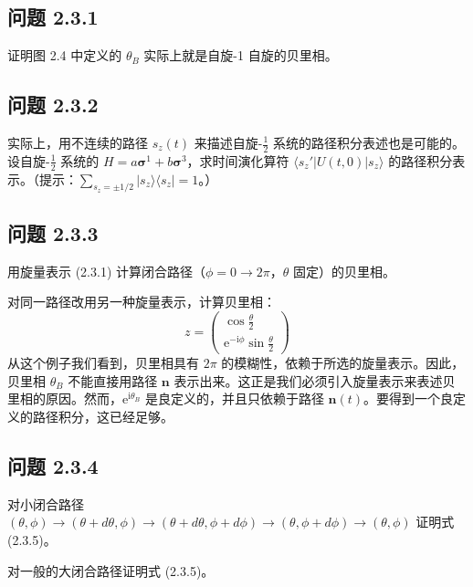 \subsection*{问题 2.3.1}
证明图 2.4 中定义的 $\theta_B$ 实际上就是自旋-1 自旋的贝里相。

\subsection*{问题 2.3.2}
实际上，用不连续的路径 $s_z(t)$ 来描述自旋-$\frac{1}{2}$ 系统的路径积分表述也是可能的。设自旋-$\frac{1}{2}$ 系统的 $H = a\pmb{\sigma}^1 + b\pmb{\sigma}^3$，求时间演化算符 $\langle s_z'|U(t,0)|s_z\rangle$ 的路径积分表示。（提示：$\sum_{s_z=\pm 1/2}|s_z\rangle\langle s_z| = 1$。）

\subsection*{问题 2.3.3}
用旋量表示 (2.3.1) 计算闭合路径（$\phi = 0 \to 2\pi$，$\theta$ 固定）的贝里相。

对同一路径改用另一种旋量表示，计算贝里相：
\begin{equation*}
z = \begin{pmatrix} \cos\frac{\theta}{2} \\[2pt] \mathrm{e}^{-\mathrm{i}\phi}\sin\frac{\theta}{2} \end{pmatrix}
\end{equation*}
从这个例子我们看到，贝里相具有 $2\pi$ 的模糊性，依赖于所选的旋量表示。因此，贝里相 $\theta_B$ 不能直接用路径 $\pmb{n}$ 表示出来。这正是我们必须引入旋量表示来表述贝里相的原因。然而，$\mathrm{e}^{\mathrm{i}\theta_B}$ 是良定义的，并且只依赖于路径 $\pmb{n}(t)$。要得到一个良定义的路径积分，这已经足够。

\subsection*{问题 2.3.4}
对小闭合路径 $(\theta,\phi) \to (\theta+d\theta, \phi) \to (\theta+d\theta, \phi+d\phi) \to (\theta, \phi+d\phi) \to (\theta, \phi)$ 证明式 (2.3.5)。

对一般的大闭合路径证明式 (2.3.5)。

